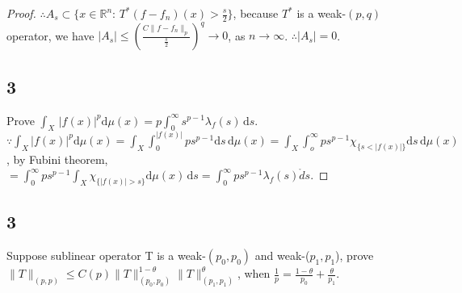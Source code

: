\documentclass{amsart}
\theoremstyle{definition}
\theoremstyle{remark}
\numberwithin{equation}{section}
\begin{document}
\begin{proof}
$\therefore A_s\subset \{x\in\mathbb{R}^n:\,T^*(f-f_n)(x)>\frac{s}{2}\}$, because $T^*$ is a weak-$(p,q)$ operator, we have $|A_s|\leq(\frac{C\|f-f_n\|_p}{\frac{s}{2}})^q\to 0$, as $n\to \infty$. $\therefore |A_s|=0$.
\subsection{3}
Prove $\int_X\,|f(x)|^p\mathrm{d}\mu(x)=p\int_0^{\infty}s^{p-1}\lambda_f(s)\,\mathrm{d}s$.
\proof $\because \int_X |f(x)|^p\mathrm{d}\mu(x)=\int_X \int_0^{|f(x)|} ps^{p-1}\mathrm{d}s\,\mathrm{d}\mu(x)=\int_X\int_o^{\infty}ps^{p-1}\chi_{\{s<|f(x)|\}}\mathrm{d}s\,\mathrm{d}\mu(x)$, by Fubini theorem, $=\int_{0}^{\infty}ps^{p-1}\int_X \chi_{\{|f(x)|>s\}}\mathrm{d}\mu(x)\,\mathrm{d}s=\int_{0}^{\infty} ps^{p-1}\lambda_f(s)\mathring{d}s$.
\end{proof}
\subsection{3}
Suppose sublinear operator T is a weak-$(p_0,p_0)$ and weak-($p_1,p_1$), prove $\|T\|_(p,p)\leq C(p)\|T\|_{(p_0,p_0)}^{1-\theta}\|T\|_{(p_1,p_1)}^\theta$, when $\frac{1}{p}=\frac{1-\theta}{p_0}+\frac{\theta}{p_1}$.
\proof
\end{document}
